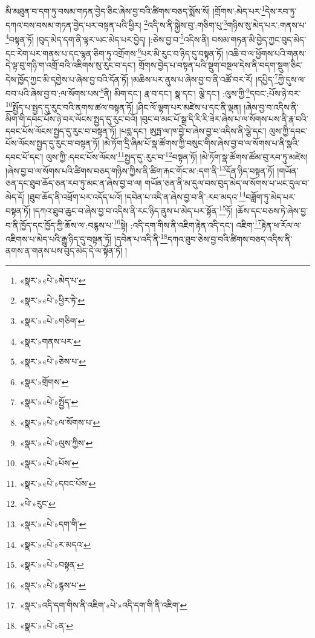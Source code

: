 མི་མཐུན་བ་དག་ཏུ་བསམ་གཏན་བྱེད་ཅིང་ཞེས་བྱ་བའི་ཚིགས་བཅད་སྨོས་སོ། །གྲོགས་:མེད་པར་\footnote{«སྣར་»«པེ་»མེད་པ་}དེས་རབ་ཏུ་དཀའ་བས་བསམ་གཏན་བྱེད་པར་བསྟན་པའི་ཕྱིར། \footnote{«སྣར་»«པེ་»ཕྱིར་ཏེ་}འདི་ས་ནི་སྐྱེས་བུ་:གཅིག་པུ་\footnote{«སྣར་»«པེ་»གཅིག་}གཉིས་སུ་མེད་པར་:གནས་པ་\footnote{«སྣར་»གནས་པར་}བསྟན་ཏོ། །བུད་མེད་དག་ནི་ལྟར་ཡང་མེད་པར་བྱེད། །:ཅེས་བྱ་བ་\footnote{«སྣར་»«པེ་»ཅེས་པ་}འདིས་ནི། བསམ་གཏན་མི་བྱེད་ཀྱང་བུད་མེད་དང་རེག་པར་གནས་པ་དང་ལྷན་ཅིག་ཏུ་འགྲོགས་\footnote{«སྣར་»གྲོགས་}པར་མི་རུང་བ་ཉིད་དུ་བསྟན་ཏོ། །འཆི་བ་ལ་ཕྱོགས་པའི་གནས་དེ་ལྟ་བུ་གཉི་ག་འགྲོ་བའི་འཇིགས་སུ་རུང་བ་དང་། གྲོགས་བྱེད་པ་བསྟན་པའི་སྡུག་བསྔལ་དེས་ནི་བདག་སྡུག་ཅིང་དེས་ཁྱོད་ཀྱང་མི་དགྱེས་པ་ཞེས་བྱ་བའི་དོན་ཏོ། །མཆིས་པར་ནུས་པ་ཞེས་བྱ་བ་ནི་འཚོ་བར་རོ། །དཔྱིད་\footnote{«སྣར་»«པེ་»སྤྱོད་}ཀྱི་དུས་ལ་བབ་པའི་ཞེས་བྱ་བ་:ལ་སོགས་པས་\footnote{«སྣར་»«པེ་»ལ་སོགས་པ་}ནི། མིག་དང་། རྣ་བ་དང་། སྣ་དང་། ལྕེ་དང་། :ལུས་ཀྱི་\footnote{«སྣར་»«པེ་»ལུས་ཀྱིས་}དབང་:པོས་ཉེ་བར་\footnote{«སྣར་»«པེ་»པོས་}སྤྱོད་པ་སྤྱད་དུ་རུང་བའི་ནགས་ཚལ་བསྟན་ཏོ། །ཤིང་ལོ་ལྷག་པར་མཛེས་པ་དང་ནི་ལྡན། །ཞེས་བྱ་བ་འདིས་ནི་མིག་གི་དབང་པོས་ཉེ་བར་ལོངས་སྤྱད་དུ་རུང་བའོ། །བུང་བ་མང་པོ་སྒྲ་དི་རི་རི་ཟེར་ཞེས་པ་ལ་སོགས་པས་ནི་རྣ་བའི་དབང་པོས་ལོངས་སྤྱད་དུ་རུང་བ་བསྟན་ཏོ། །པདྨ་དང་། ཨུཏྤ་ལ་ཁ་བྱེ་བ་ཞེས་བྱ་བ་འདིས་ནི་ལྕེ་དང་། ལུས་ཀྱི་དབང་པོས་ལོངས་སྤྱད་དུ་རུང་བ་བསྟན་ཏོ། །མེ་ཏོག་དྲི་ཞིམ་པོ་སྣ་ཚོགས་ཀྱི་བསུང་གིས་ཞེས་བྱ་བ་ལ་སོགས་པ་ནི་སྣའི་དབང་པོ་དང་། ལུས་ཀྱི་:དབང་པོས་ལོངས་\footnote{«སྣར་»«པེ་»དབང་པོས་}སྤྱད་དུ་:རུང་བ་\footnote{«པེ་»རུང་}བསྟན་ཏོ། །མེ་ཏོག་སྣ་ཚོགས་ཚོམ་བུ་རབ་ཏུ་མཛེས། །ཞེས་བྱ་བ་ལ་སོགས་པའི་ཚིགས་བཅད་གཉིས་ཀྱིས་ནི་ཚིག་རྐང་གོང་མ་:དག་ནི་\footnote{«སྣར་»«པེ་»དག་གི་}དོན་ཉིད་བསྟན་ཏོ། །གཡོན་ཅན་དང་ཐུབ་ཆོད་ཅན་རབ་ཏུ་མང་ན་ཞེས་བྱ་བ་ལ། གཡོན་ཅན་ནི་མ་དུལ་བས་བུད་མེད་ལ་སོགས་པ་ཡང་དུལ་བ་མེད་དོ། །ཐུབ་ཆོད་ནི་འཕྲོག་པར་འདོད་པའོ། །དབེན་པ་འདི་ན་ཞེས་བྱ་བ་ནི་:རབ་མདའ་\footnote{«སྣར་»«པེ་»ར་མདའ་}བཟློག་ཏུ་མེད་པར་བསྟན་ཏོ། །དཀའ་ཐུབ་ཆུང་བ་ཞེས་བྱ་བ་འདིས་ནི་རང་ཉིད་ནུས་པ་མེད་པར་སྟོན་\footnote{«སྣར་»«པེ་»བསྟན་}ཏོ། །ཆོས་དང་བཅས་ཏེ་ཞེས་བྱ་བ་ནི་ཁྱོད་དང་ཁྱོད་ཀྱི་ཆོས་ལ་:བརྙས་པ་\footnote{«སྣར་»«པེ་»རྙས་པ་}སྟེ། :འདི་དག་གིས་ནི་འཇིག་རྟེན་འདི་དང་། འཇིག་\footnote{«སྣར་»འདི་དག་གིས་ནི་འཇིག་«པེ་»འདི་དག་གི་ནི་འཇིག་}རྟེན་ཕ་རོལ་ལ་འཇིགས་པ་མེད་པའི་རྒྱུ་ཉིད་དུ་བསྟན་ཏོ། །དབེན་པ་འདི་ནི་\footnote{«སྣར་»«པེ་»ན་}དཀའ་ཐུབ་ཅེས་བྱ་བའི་ཚིགས་བཅད་འདིས་ནི་ནགས་ན་གནས་པས་བུད་མེད་དེ་ལ་སྟོན་ཏོ། །
